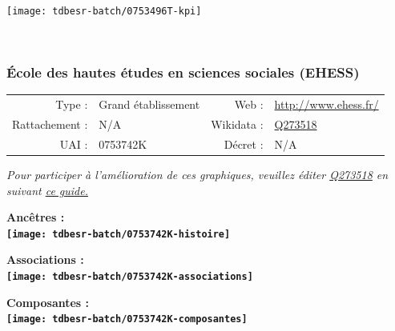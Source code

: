 \documentclass[12pt,french,]{article}
\begin{document}
\begin{center}\texttt{[image: tdbesr-batch/0753496T-kpi]} \end{center}\checkoddpage

\ifoddpage ~\newpage \fi   

\hypertarget{uxe9cole-des-hautes-uxe9tudes-en-sciences-sociales-ehess}{%
\subsubsection{École des hautes études en sciences sociales
(EHESS)}\label{uxe9cole-des-hautes-uxe9tudes-en-sciences-sociales-ehess}}

\begin{tabular*}{\textwidth}{rp{5cm}rl}  
\hline  
Type : & Grand établissement & Web : &\href{http://www.ehess.fr/}{http://www.ehess.fr/} \\  
Rattachement : & N/A & Wikidata : & \href{https://www.wikidata.org/entity/Q273518}{Q273518} \\  
UAI : & 0753742K & Décret : & N/A \\  
\hline  
\end{tabular*}

\textit{\scriptsize Pour participer à l'amélioration de ces graphiques, veuillez éditer  \href{https://www.wikidata.org/entity/Q273518}{Q273518}  en suivant \href{https://github.com/cpesr/wikidataESR/blob/master/Rmd/wikidataESR.md}{ce guide.}}

\vspace{1cm}  
\begin{minipage}[b]{0.50\textwidth}\begin{center} \bf Ancêtres : \\  
\texttt{[image: tdbesr-batch/0753742K-histoire]} \end{center}\end{minipage}\begin{minipage}[b]{0.50\textwidth}\begin{center} \bf Associations : \\  
\texttt{[image: tdbesr-batch/0753742K-associations]} \end{center}\end{minipage}

\hrulefill

\begin{center} \bf Composantes : \\  
\texttt{[image: tdbesr-batch/0753742K-composantes]} \end{center}
\end{document}
